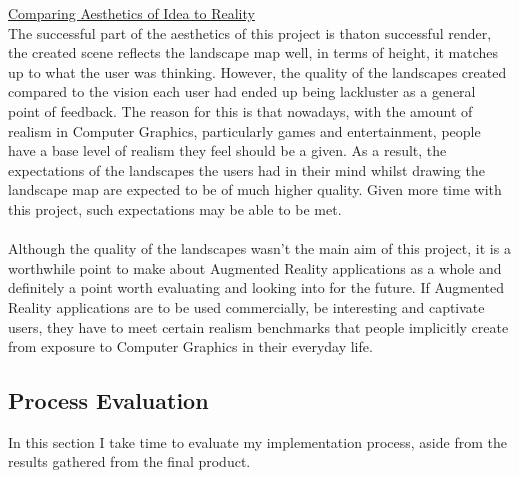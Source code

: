 \documentclass[11pt]{article}
\begin{document}
\underline{Comparing Aesthetics of Idea to Reality}\\
The successful part of the aesthetics of this project is thaton successful
render, the created scene reflects the landscape map well, in terms of 
height, it matches up to what the user was thinking. However, the quality 
of the landscapes created compared to the vision each user had ended
up being lackluster as a general point of feedback. The reason for this
is that nowadays, with the amount of realism in Computer Graphics,
particularly games and entertainment, people have a base level of
realism they feel should be a given. As a result, the expectations
of the landscapes the users had in their mind whilst drawing the 
landscape map are expected to be of much higher quality. Given more time
with this project, such expectations may be able to be met. \\
\\
Although the quality of the landscapes wasn't the main
aim of this project, it is a worthwhile point to make about Augmented
Reality applications as a whole and definitely a point worth
evaluating and looking into for the future. If Augmented
Reality applications are to be used commercially, be
interesting and captivate users, they have to meet certain realism 
benchmarks that people implicitly create from exposure to 
Computer Graphics in their everyday life.

\subsection{Process Evaluation}
In this section I take time to evaluate my implementation process, aside
from the results gathered from the final product.
\end{document}
